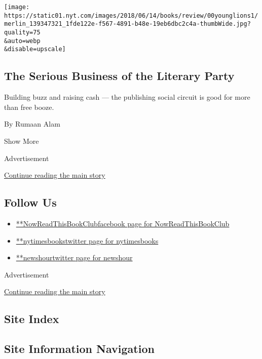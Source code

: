 \begin{enumerate}
  \texttt{[image: https://static01.nyt.com/images/2018/06/14/books/review/00younglions1/merlin\_139347321\_1fde122e-f567-4891-b48e-19eb6dbc2c4a-thumbWide.jpg?quality=75\\\&auto=webp\\\&disable=upscale]}

  \hypertarget{the-serious-business-of-the-literary-party}{%
  \subsection{The Serious Business of the Literary
  Party}\label{the-serious-business-of-the-literary-party}}

  Building buzz and raising cash --- the publishing social circuit is
  good for more than free booze.

  By Rumaan Alam
\end{enumerate}

Show More

Advertisement

\protect\hyperlink{after-mid2}{Continue reading the main story}

\hypertarget{follow-us}{%
\subsection{Follow Us}\label{follow-us}}

\begin{itemize}
\tightlist
\item
  \href{https://www.facebook.com/NowReadThisBookClub}{**NowReadThisBookClubfacebook
  page for NowReadThisBookClub}
\item
  \href{https://twitter.com/nytimesbooks}{**nytimesbookstwitter page for
  nytimesbooks}
\item
  \href{https://twitter.com/newshour}{**newshourtwitter page for
  newshour}
\end{itemize}

Advertisement

\protect\hyperlink{after-mktg}{Continue reading the main story}

\hypertarget{site-index}{%
\subsection{Site Index}\label{site-index}}

\hypertarget{site-information-navigation}{%
\subsection{Site Information
Navigation}\label{site-information-navigation}}


